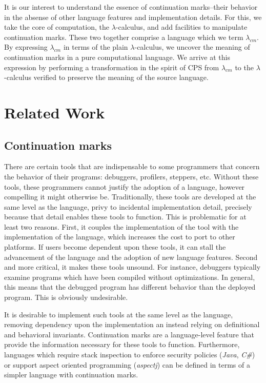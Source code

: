 \documentclass[ms]{byuprop}
\newcounter{definition}
\begin{document}
It is our interest to understand the essence of continuation marks--their behavior in the 
absense of other language features and implementation details. For this, we take the core 
of computation, the $\lambda$-calculus, and add facilities to manipulate continuation 
marks. These two together comprise a language which we term $\lambda_{cm}$. By expressing 
$\lambda_{cm}$ in terms of the plain $\lambda$-calculus, we uncover the meaning of 
continuation marks in a pure computational language. We arrive at this expression by 
performing a transformation in the spirit of CPS from $\lambda_{cm}$ to the $\lambda$-calculus 
verified to preserve the meaning of the source language.

\section{Related Work}

\subsection{Continuation marks}

There are certain tools that are indispensable to some programmers that concern the
behavior of their programs: debuggers, profilers, steppers, etc. Without these tools,
these programmers cannot justify the adoption of a language, however compelling it might
otherwise be. Traditionally, these tools are developed at the same level as the 
language, privy to incidental implementation detail, precisely because that detail 
enables these tools to function. This is problematic for at least two reasons. First, 
it couples the implementation of the tool with the implementation of the language, which
increases the cost to port to other platforms. If users become dependent upon these tools,
it can stall the advancement of the language and the adoption of new language features.
Second and more critical, it makes these tools unsound. For instance, debuggers typically
examine programs which have been compiled without optimizations. In general, this means 
that the debugged program has different behavior than the deployed program. This is 
obviously undesirable.

It is desirable to implement such tools at the same level as the language, removing
dependency upon the implementation an instead relying on definitional and behavioral
invariants. Continuation marks are a language-level feature that provide the information
necessary for these tools to function. Furthermore, languages which require stack
inspection to enforce security policies (\emph{Java}, \emph{C\#}) or support aspect
oriented programming (\emph{aspectj}) can be defined in terms of a simpler language with
continuation marks.
\end{document}
